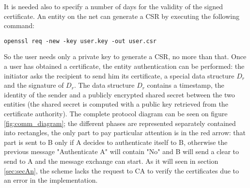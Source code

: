\documentclass{article}
\begin{document}
It is needed also to specify a number of days for the validity of the signed certificate.\newline
An entity on the net can generate a CSR by executing the following command:

\begin{lstlisting}[breaklines]
openssl req -new -key user.key -out user.csr
\end{lstlisting}

So the user needs only a private key to generate a CSR, no more than that. Once a user has obtained a certificate, the entity authentication can be performed: the initiator asks the recipient to send him its certificate, a special data structure \textit{$D_r$} and the signature of \textit{$D_r$}. The data structure \textit{$D_r$} contains a timestamp, the identity of the sender and a publicly encrypted shared secret between the two entities (the shared secret is computed with a public key retrieved from the certificate authority).\newline
The complete protocol diagram can be seen on figure \ref{fig:comm_diagram}; the different phases are represented separately contained into rectangles, the only part to pay particular attention is in the red arrow: that part is sent to B only if A decides to authenticate itself to B, otherwise the previous message "Authenticate A" will contain "No" and B will send a clear to send to A and the message exchange can start. As it will seen in section \ref{sec:secAn}, the scheme lacks the request to CA to verify the certificates due to an error in the implementation.
\end{document}
